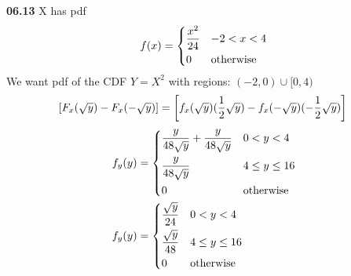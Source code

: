 {\bf 06.13}
X has pdf 
\begin{equation*}
f(x)= 
\begin{dcases}
     \frac{x^{2}}{24} & -2<x<4 \\
     0 				  & \text{otherwise}
\end{dcases}
\end{equation*}
We want pdf of the CDF $ Y=X^{2} $ 
with regions: $ (-2,0) \cup [0,4) $
\begin{equation*}
\left[ F_{x}(\sqrt{y})-F_{x}(-\sqrt{y}) \right]  = 
\left[ f_{x}(\sqrt{y})(\frac{1}{2}\sqrt{y})-f_{x}(-\sqrt{y})(-\frac{1}{2}\sqrt{y}) \right] \\
\end{equation*}
\begin{equation*}
\begin{split}
f_{y}(y) & = 
\begin{dcases}
	\frac{y}{48\sqrt{y}}+\frac{y}{48\sqrt{y}} & 0<y<4 \\
	\frac{y}{48\sqrt{y}}                      & 4 \leq y \leq 16 \\
	0                                         & \text{otherwise} 
\end{dcases}
\\
f_{y}(y) & =
\begin{dcases}
	\frac{\sqrt{y}}{24}                      & 0<y<4 \\
	\frac{\sqrt{y}}{48}                      & 4 \leq y \leq 16 \\
	0                                        & \text{otherwise} 
\end{dcases}
\end{split}
\end{equation*}
